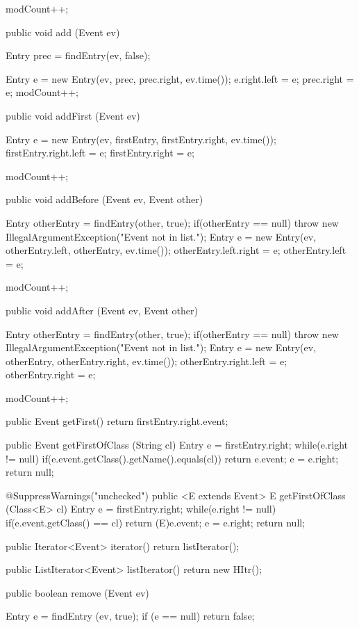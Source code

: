 \begin{code}
\begin{hide}
{{      modCount++;
   }


   public void add (Event ev) {
      Entry prec = findEntry(ev, false);

      Entry e = new Entry(ev, prec, prec.right, ev.time());
      e.right.left = e;
      prec.right = e;
      modCount++;
   }

   public void addFirst (Event ev) {
      Entry e = new Entry(ev, firstEntry, firstEntry.right, ev.time());
      firstEntry.right.left = e;
      firstEntry.right = e;

      modCount++;
   }

   public void addBefore (Event ev, Event other) {
      Entry otherEntry = findEntry(other, true);
      if(otherEntry == null)
         throw new IllegalArgumentException("Event not in list.");
      Entry e = new Entry(ev, otherEntry.left, otherEntry, ev.time());
      otherEntry.left.right = e;
      otherEntry.left = e;

      modCount++;
   }

   public void addAfter (Event ev, Event other) {
      Entry otherEntry = findEntry(other, true);
      if(otherEntry == null)
         throw new IllegalArgumentException("Event not in list.");
      Entry e = new Entry(ev, otherEntry, otherEntry.right, ev.time());
      otherEntry.right.left = e;
      otherEntry.right = e;

      modCount++;
   }


   public Event getFirst() {
      return firstEntry.right.event;
   }

   public Event getFirstOfClass (String cl) {
      Entry e = firstEntry.right;
      while(e.right != null) {
         if(e.event.getClass().getName().equals(cl))
            return e.event;
         e = e.right;
      }
      return null;
   }

   @SuppressWarnings("unchecked")
   public <E extends Event> E getFirstOfClass (Class<E> cl) {
      Entry e = firstEntry.right;
      while(e.right != null) {
         if(e.event.getClass() == cl)
            return (E)e.event;
         e = e.right;
      }
      return null;
   }

   public Iterator<Event> iterator() {
      return listIterator();
   }

   public ListIterator<Event> listIterator() {
      return new HItr();
   }

   public boolean remove (Event ev) {
      Entry e = findEntry (ev, true);
      if (e == null)
         return false;

}}
\end{hide}
\end{code}

